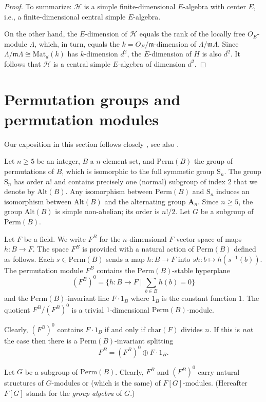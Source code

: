 \documentclass[12pt,a4paper,reqno]{amsart}
\def\An{{\mathbf A}_n}
\def\Perm{\mathrm{Perm}}
\def\Alt{\mathrm{Alt}}
\def\Mat{\mathrm{Mat}}
\def\fchar{\mathrm{char}}
\theoremstyle{definition}
\begin{document}
\begin{proof}
To summarize: $\mathcal{H}$ is a simple finite-dimensional $E$-algebra with center $E$, i.e., a finite-dimensional central simple $E$-algebra.

On the other hand, the $E$-dimension of $\mathcal{H}$ equals the rank of the locally free $O_E$-module $\Lambda$, which, in turn,
equals the $k=O_E/\mathfrak{m}$-dimension of $\Lambda/\mathfrak{m}\Lambda$. Since
 $\Lambda/\mathfrak{m}\Lambda \cong \Mat_d(k)$ has $k$-dimension $d^2$, the $E$-dimension of $H$ is also $d^2$.
 It follows that $\mathcal{H}$ is a central simple $E$-algebra of dimension $d^2$.



\end{proof}


\section{Permutation groups and permutation modules}
\label{permute}
Our exposition in this section follows closely \cite[Sect. 2]{ZarhinCrelle}, see also \cite{Mortimer}.

Let $n \ge 5$ be an integer, $B$ a $n$-element set, and
 $\Perm(B)$  the group of permutations of $B$, which is isomorphic to the full symmetic group $\mathrm{S}_n$.
 The group  $\mathrm{S}_n$ has order $n!$ and contains precisely one (normal) subgroup of index $2$ that we denote by 
 $\Alt(B)$. Any isomorphism  between $\Perm(B)$ and $\mathrm{S}_n$ induces an isomorphism between $\Alt(B)$ and  the alternating group $\An$. 
 Since $n \ge 5$, the group  $\Alt(B)$ is simple non-abelian; its order is   $n!/2$.
Let $G$ be a  subgroup of $\Perm(B)$.


Let $F$ be a field. We write $F^B$
for the $n$-dimensional $F$-vector space of maps $h:B \to F$.
The space $F^B$ is  provided with a natural action of $\Perm(B)$ defined
as follows. Each $s \in \Perm(B)$ sends a map
 $h:B\to F$ into  $sh:b \mapsto h(s^{-1}(b))$. The permutation module $F^B$
contains the $\Perm(B)$-stable hyperplane
$$(F^B)^0=
\{h:B\to F\mid\sum_{b\in B}h(b)=0\}$$
and the $\Perm(B)$-invariant line $F \cdot 1_B$ where $1_B$ is the constant function $1$. The quotient $F^B/(F^B)^0$ is a trivial $1$-dimensional $\Perm(B)$-module.

Clearly, $(F^B)^0$ contains $F \cdot 1_B$ if and only if $\fchar(F)$ divides $n$.
 If this is {\sl not} the case then there is a $\Perm(B)$-invariant splitting
$$F^B=(F^B)^0 \oplus F \cdot 1_B.$$


Let $G$ be a subgroup of  $\Perm(B)$.
Clearly, $F^B$ and $(F^B)^0$  carry natural structures of  $G$-modules or (which is the same) of $F[G]$-modules. (Hereafter $F[G]$ stands for the {\sl group algebra} of $G$.)
\end{document}
